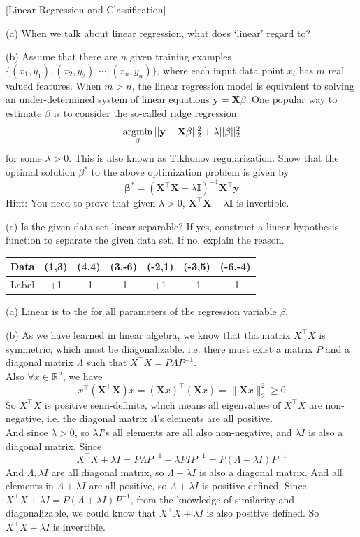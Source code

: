 \item {} [Linear Regression and Classification]

(a) When we talk about linear regression, what does `linear' regard to? 

(b) Assume that there are $n$ given training examples $\{(x_1, y_1), (x_2, y_2), \cdots, (x_n, y_n)\}$, where each input data point $x_i$ has $m$ real valued features. When $m > n$, the linear regression model is equivalent to solving an under-determined system of linear equations $\mathbf{y} = \mathbf{X}\beta$. One popular way to estimate $\beta$ is to consider the so-called ridge regression:
$$\mathop{\rm argmin}_{\beta} ||\mathbf{y}-\mathbf{X}\mathbf{\beta}||_2^2 + \lambda||\beta||_2^2$$
for some $\lambda > 0$. This is also known as Tikhonov regularization. Show that the optimal solution $\beta^*$ to the above optimization problem is given by
$$\mathbf{\beta}^* = (\mathbf{X}^{\top}\mathbf{X} + \lambda \mathbf{I})^{-1}\mathbf{X}^{\top}\mathbf{y}$$
Hint: You need to prove that given $\lambda>0$, $\mathbf{X}^{\top}\mathbf{X} + \lambda \mathbf{I}$ is invertible. 

(c) Is the given data set linear separable? If yes, construct a linear hypothesis function to separate the given data set. If no, explain the reason. 
\begin{table}[h]
    \centering
    \begin{tabular}{c|cccccc}
        Data & (1,3) & (4,4) & (3,-6) & (-2,1) & (-3,5) & (-6,-4) \\ \hline
        Label & +1 & -1 & -1 & +1 & -1 & -1
    \end{tabular}
    \label{tab:my_label}
\end{table}

\solution

(a) Linear is to the for all parameters of the regression variable $\beta$.

(b) As we have learned in linear algebra, we know that tha matrix $X^{\top}X$ is symmetric, which must be diagonalizable. i.e. there must exist a matrix $P$ and a diagonal matrix $\Lambda$ such that $X^{\top}X=P\Lambda P^{-1}$.\\
Also $\forall x\in\mathbb{R}^n$, we have
$$x^{\top}(\mathbf{X}^{\top}\mathbf{X}) x=(\mathbf{X}x)^{\top}(\mathbf{X}x)=\|\mathbf{X}x\|_2^2\geq0$$
So $X^{\top}X$ is positive semi-definite, which means all eigenvalues of $X^{\top}X$ are non-negative, i.e. the diagonal matrix $\Lambda$'s elements are all positive. \\
And since $\lambda>0$, so $\lambda I$'s all elements are all also non-negative, and $\lambda I$ is also a diagonal matrix. Since
$$X^{\top}X+\lambda I=P\Lambda P^{-1}+\lambda PIP^{-1}=P(\Lambda+\lambda I)P^{-1}$$
And $\Lambda, \lambda I$ are all diagonal matrix, so $\Lambda+\lambda I$ is also a diagonal matrix. And all elements in $\Lambda+\lambda I$ are all positive, so $\Lambda+\lambda I$ is positive defined. Since $X^{\top}X+\lambda I=P(\Lambda+\lambda I)P^{-1}$,
from the knowledge of similarity and diagonalizable, we could know that $X^{\top}X+\lambda I$ is also positive defined. So $X^{\top}X+\lambda I$ is invertible.

